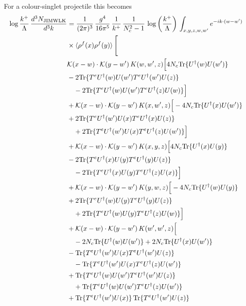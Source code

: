 For a colour-singlet projectile this becomes
\begin{align}\label{eq:JIMWLKsinglet}
    \log\frac{k^+}{\Lambda}\,\frac{d^{3}N_{\rm JIMWLK}}{d^{3}k} & = \frac{1}{(2\pi)^{3}}\,\frac{g^{4}}{16\pi^{5}}\,\frac{1}{k^{+}}\,\frac{1}{N^{2}_{c}-1}\,\log{\left(\frac{k^{+}}{\Lambda}\right)}\,\int_{x,y,z,w,w'}e^{-ik\cdot(w-w')}\notag\\&\times\langle\rho^{f}(x)\rho^{f}(y) \rangle\,\Bigg[\notag \\ & \mathcal K(x-w)\cdot\mathcal K(y-w')\,K(w,w',z)\Big[4 N_{c}{\rm Tr}\{U^\dagger(w)U(w')\}\notag\\
&-2{\rm Tr}\{T^eU^\dagger(w)U(w')T^eU^\dagger(w')U(z)\}\notag\\
&\quad-2{\rm Tr}\{T^eU^\dagger(w)U(w')T^eU^\dagger(z)U(w)\}\Big]\notag\\
&+\mathcal K(x-w)\cdot\mathcal K(y-w')\,K(x,w',z)\Big[-4 N_{c}{\rm Tr}\{U^\dagger(x)U(w')\}\notag\\
&+2{\rm Tr}\{T^eU^\dagger(w')U(x)T^eU^\dagger(x)U(z)\}\notag\\
&\quad+2{\rm Tr}\{T^eU^\dagger(w')U(x)T^eU^\dagger(z)U(w')\}\Big]\notag\\
&+\mathcal K(x-w)\cdot\mathcal K(y-w')\,K(x,y,z)\Big[4 N_{c}{\rm Tr}\{U^\dagger(x)U(y)\}\notag\\
&-2{\rm Tr}\{T^eU^\dagger(x)U(y)T^eU^\dagger(y)U(z)\}\notag\\
&\quad-2{\rm Tr}\{T^eU^\dagger(x)U(y)T^eU^\dagger(z)U(x)\}\Big]\notag\\
&+\mathcal K(x-w)\cdot\mathcal K(y-w')\,K(y,w,z)\Big[-4 N_{c}{\rm Tr}\{U^\dagger(w)U(y)\}\notag\\
&+2{\rm Tr}\{T^eU^\dagger(w)U(y)T^eU^\dagger(y)U(z)\}\notag\\
&\quad+2{\rm Tr}\{T^eU^\dagger(w)U(y)T^eU^\dagger(z)U(w)\}\Big]\notag\\
&+\mathcal K(x-w)\cdot\mathcal K(y-w')\,K(w',w',z)\Big[\notag\\
&\quad-2 N_{c}{\rm Tr}\{U^\dagger(w)U(w')\}+2 N_{c}{\rm Tr}\{U^\dagger(x)U(w')\}\notag\\
&-{\rm Tr}\{T^eU^\dagger(w')U(x)T^eU^\dagger(w')U(z)\}\notag\\
&\quad-{\rm Tr}\{T^eU^\dagger(w')U(x)T^eU^\dagger(z)U(w')\}\notag\\
&+{\rm Tr}\{T^eU^\dagger(w)U(w')T^eU^\dagger(w')U(z)\}\notag\\
&\quad+{\rm Tr}\{T^eU^\dagger(w)U(w')T^eU^\dagger(z)U(w')\}\notag\\
&+{\rm Tr}\{T^eU^\dagger(w')U(x)\}\,{\rm Tr}\{T^eU^\dagger(w')U(z)\}\notag\\

\end{align}
